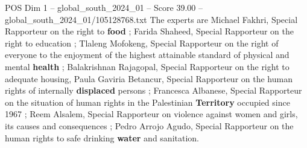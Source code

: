 \begin{textsample}{POS Dim 1 – global\_south\_2024\_01 – Score 39.00 – global\_south\_2024\_01/105128768.txt}
The experts are Michael Fakhri, Special Rapporteur on the right to \textbf{food} ; Farida Shaheed, Special Rapporteur on the right to education ; Tlaleng Mofokeng, Special Rapporteur on the right of everyone to the enjoyment of the highest attainable standard of physical and mental \textbf{health} ; Balakrishnan Rajagopal, Special Rapporteur on the right to adequate housing, Paula Gaviria Betancur, Special Rapporteur on the human rights of internally \textbf{displaced} persons ; Francesca Albanese, Special Rapporteur on the situation of human rights in the Palestinian \textbf{Territory} occupied since 1967 ; Reem Alsalem, Special Rapporteur on violence against women and girls, its causes and consequences ; Pedro Arrojo Agudo, Special Rapporteur on the human rights to safe drinking \textbf{water} and sanitation.

\end{textsample}
